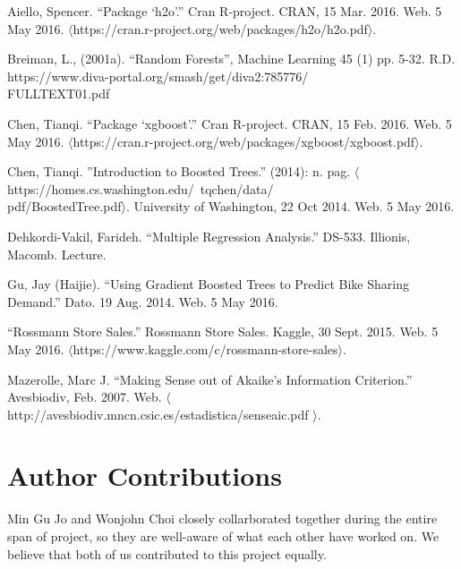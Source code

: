 \documentclass[letterpaper,twocolumn,11pt]{article}
\begin{document}
Aiello, Spencer. ``Package ‘h2o'.'' Cran R-project. CRAN, 15 Mar. 2016. Web. 5 May 2016. $\langle$https://cran.r-project.org/web/packages/h2o/h2o.pdf$\rangle$.

Breiman, L., (2001a). ``Random Forests'', Machine Learning 45 (1) pp. 5-32.
R.D. https://www.diva-portal.org/smash/get/diva2:785776/\\
FULLTEXT01.pdf

Chen, Tianqi. ``Package ‘xgboost'.'' Cran R-project. CRAN, 15 Feb. 2016. Web. 5 May 2016. $\langle$https://cran.r-project.org/web/packages/xgboost/xgboost.pdf$\rangle$.

Chen, Tianqi. ”Introduction to Boosted Trees.” (2014): n. pag. $\langle$https://homes.cs.washington.edu/~tqchen/data/\\
pdf/BoostedTree.pdf$\rangle$. University of Washington, 22 Oct 2014. Web. 5 May 2016.

Dehkordi-Vakil, Farideh. ``Multiple Regression Analysis.'' DS-533. Illionis, Macomb. Lecture.

Gu, Jay (Haijie). ``Using Gradient Boosted Trees to Predict Bike Sharing Demand.'' Dato. 19 Aug. 2014. Web. 5 May 2016.

``Rossmann Store Sales.'' Rossmann Store Sales. Kaggle, 30 Sept. 2015. Web. 5 May 2016. $\langle$https://www.kaggle.com/c/rossmann-store-sales$\rangle$.

Mazerolle, Marc J. ``Making Sense out of Akaike’s Information Criterion.'' Avesbiodiv, Feb. 2007. Web. $\langle$ http://avesbiodiv.mncn.csic.es/estadistica/senseaic.pdf $\rangle$.

\section{Author Contributions}
Min Gu Jo and Wonjohn Choi closely collarborated together during the entire span of project, so they are well-aware of what each other have worked on. We believe that both of us contributed to this project equally.
\end{document}
